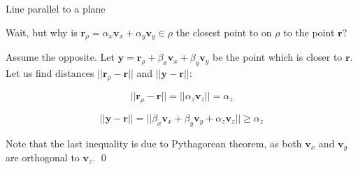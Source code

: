 \documentclass{beamer}
\begin{document}
\begin{frame}{Line parallel to a plane}
	\begin{flushleft}
		
		Wait, but why is $\mathbf r_\rho = \alpha_x \mathbf v_x + \alpha_y \mathbf v_y \in \rho$ the closest point to on $\rho$ to the point $\mathbf r$?
		
		\bigskip
		
		Assume the opposite. Let $\mathbf y = \mathbf r_\rho + \beta_x \mathbf v_x + \beta_y \mathbf v_y$ be the point which is closer to $\mathbf r$. Let us find distances $||\mathbf r_\rho - \mathbf r||$ and $||\mathbf y - \mathbf r||$:
		
		\begin{equation}
			||\mathbf r_\rho - \mathbf r|| = ||\alpha_z \mathbf v_z|| = \alpha_z
		\end{equation}
	
		\begin{equation}
		||\mathbf y - \mathbf r|| = ||\beta_x \mathbf v_x + \beta_y \mathbf v_y + \alpha_z \mathbf v_z|| \geq \alpha_z
		\end{equation}
	
	Note that the last inequality is due to Pythagorean theorem, as both $ \mathbf v_x$ and $ \mathbf v_y$ are orthogonal to $ \mathbf v_z$. \qed
		
	\end{flushleft}
\end{frame}
\end{document}
